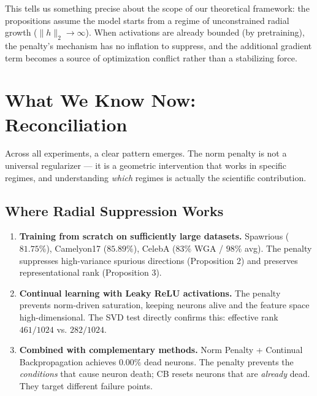 \documentclass[11pt,a4paper]{article}
\begin{document}
This tells us something precise about the scope of our theoretical framework: the propositions assume the model starts from a regime of unconstrained radial growth ($\|h\|_2 \to \infty$). When activations are already bounded (by pretraining), the penalty's mechanism has no inflation to suppress, and the additional gradient term becomes a source of optimization conflict rather than a stabilizing force.


\newpage

\section{What We Know Now: Reconciliation}
\label{sec:reconciliation}

Across all experiments, a clear pattern emerges. The norm penalty is not a universal regularizer --- it is a geometric intervention that works in specific regimes, and understanding \emph{which} regimes is actually the scientific contribution.

\subsection{Where Radial Suppression Works}

\begin{enumerate}
    \item \textbf{Training from scratch on sufficiently large datasets.} Spawrious ($81.75\%$), Camelyon17 ($85.89\%$), CelebA ($83\%$ WGA / $98\%$ avg). The penalty suppresses high-variance spurious directions (Proposition 2) and preserves representational rank (Proposition 3).

    \item \textbf{Continual learning with Leaky ReLU activations.} The penalty prevents norm-driven saturation, keeping neurons alive and the feature space high-dimensional. The SVD test directly confirms this: effective rank $461/1024$ vs. $282/1024$.

    \item \textbf{Combined with complementary methods.} Norm Penalty + Continual Backpropagation achieves $0.00\%$ dead neurons. The penalty prevents the \emph{conditions} that cause neuron death; CB resets neurons that are \emph{already} dead. They target different failure points.
\end{enumerate}
\end{document}
